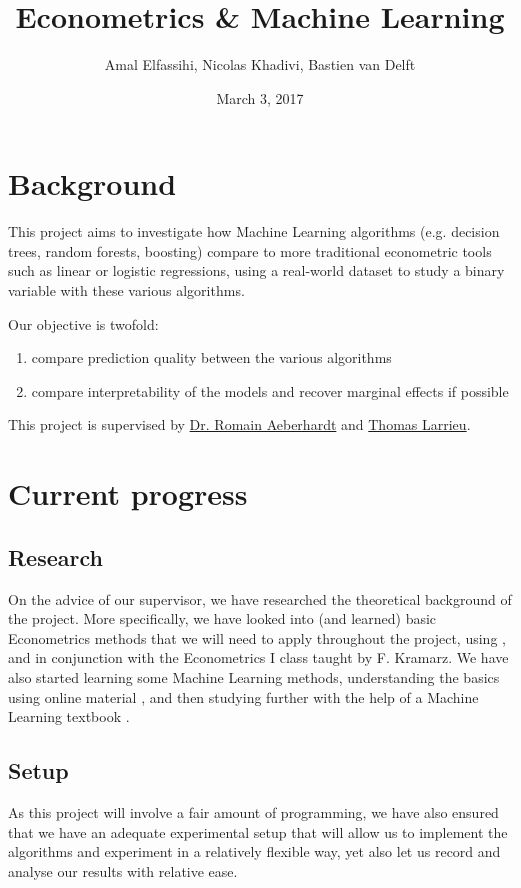 \documentclass[a4paper]{article}
\begin{document}
\title{Econometrics \& Machine Learning}
\author{Amal Elfassihi, Nicolas Khadivi, Bastien van Delft}
\date{March 3, 2017}
\maketitle

\section{Background}
This project aims to investigate how Machine Learning algorithms (e.g. decision trees, random
forests, boosting) compare to more traditional econometric tools such as linear or logistic
regressions, using a real-world dataset \cite{enquete} to study a binary variable with these
various algorithms.

Our objective is twofold:
\begin{enumerate}[nosep]
    \item compare prediction quality between the various algorithms
    \item compare interpretability of the models and recover marginal effects if possible
\end{enumerate}

This project is supervised by \href{http://www.crest.fr/pagesperso.php?user=3045}{Dr. Romain
Aeberhardt} and \href{http://thomas-larrieu.strikingly.com/}{Thomas Larrieu}.

\section{Current progress} \subsection{Research} On the advice of our supervisor, we have researched
the theoretical background of the project. More specifically, we have looked into (and learned)
basic Econometrics methods that we will need to apply throughout the project, using
\cite{wooldridge}, and in conjunction with the Econometrics I class taught by F. Kramarz. We have
also started learning some Machine Learning methods, understanding the basics using online material
\cite{vidhya}, and then studying further with the help of a Machine Learning textbook \cite{introR}.

\subsection{Setup} As this project will involve a fair amount of programming, we have also ensured
that we have an adequate experimental setup that will allow us to implement the algorithms and
experiment in a relatively flexible way, yet also let us record and analyse our results with
relative ease.
\end{document}
